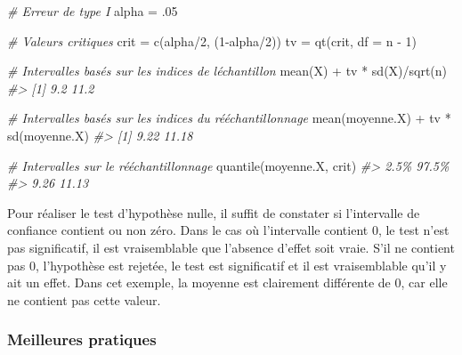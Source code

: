 \documentclass[
]{book}
\newenvironment{Shaded}{}{}
\newcommand{\AttributeTok}[1]{#1}
\newcommand{\CommentTok}[1]{\textit{#1}}
\newcommand{\DecValTok}[1]{#1}
\newcommand{\FunctionTok}[1]{#1}
\newcommand{\NormalTok}[1]{#1}
\newcommand{\OtherTok}[1]{#1}
\newcommand{\SpecialCharTok}[1]{#1}
\begin{document}
\begin{Shaded}
\begin{Highlighting}[]
\CommentTok{\# Erreur de type I}
\NormalTok{alpha }\OtherTok{=}\NormalTok{ .}\DecValTok{05}

\CommentTok{\# Valeurs critiques}
\NormalTok{crit }\OtherTok{=} \FunctionTok{c}\NormalTok{(alpha}\SpecialCharTok{/}\DecValTok{2}\NormalTok{, (}\DecValTok{1}\SpecialCharTok{{-}}\NormalTok{alpha}\SpecialCharTok{/}\DecValTok{2}\NormalTok{))}
\NormalTok{tv }\OtherTok{=} \FunctionTok{qt}\NormalTok{(crit, }\AttributeTok{df =}\NormalTok{ n }\SpecialCharTok{{-}} \DecValTok{1}\NormalTok{)}

\CommentTok{\# Intervalles basés sur les indices de l\textquotesingle{}échantillon}
\FunctionTok{mean}\NormalTok{(X) }\SpecialCharTok{+}\NormalTok{ tv }\SpecialCharTok{*} \FunctionTok{sd}\NormalTok{(X)}\SpecialCharTok{/}\FunctionTok{sqrt}\NormalTok{(n)}
\CommentTok{\#\textgreater{} [1]  9.2 11.2}

\CommentTok{\# Intervalles basés sur les indices du rééchantillonnage}
\FunctionTok{mean}\NormalTok{(moyenne.X) }\SpecialCharTok{+}\NormalTok{ tv }\SpecialCharTok{*} \FunctionTok{sd}\NormalTok{(moyenne.X)}
\CommentTok{\#\textgreater{} [1]  9.22 11.18}

\CommentTok{\# Intervalles sur le rééchantillonnage}
\FunctionTok{quantile}\NormalTok{(moyenne.X, crit)}
\CommentTok{\#\textgreater{}  2.5\% 97.5\% }
\CommentTok{\#\textgreater{}  9.26 11.13}
\end{Highlighting}
\end{Shaded}

Pour réaliser le test d'hypothèse nulle, il suffit de constater si l'intervalle de confiance contient ou non zéro. Dans le cas où l'intervalle contient 0, le test n'est pas significatif, il est vraisemblable que l'absence d'effet soit vraie. S'il ne contient pas 0, l'hypothèse est rejetée, le test est significatif et il est vraisemblable qu'il y ait un effet. Dans cet exemple, la moyenne est clairement différente de 0, car elle ne contient pas cette valeur.

\hypertarget{meilleures-pratiques}{%
\subsubsection{Meilleures pratiques}\label{meilleures-pratiques}}
\end{document}
